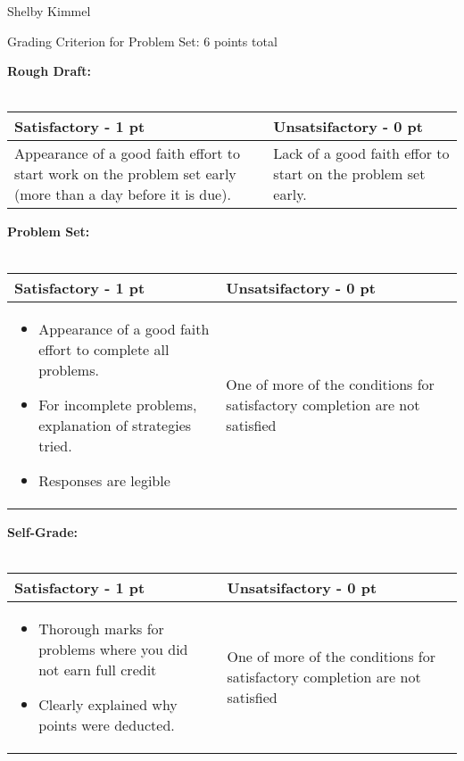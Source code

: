 \documentclass[12pt,landscape]{article}
\begin{document}
\hfill Shelby Kimmel

\begin{center}
{\huge Grading Criterion for Problem Set: 6 points total}
\end{center}
\bigskip

{\large \textbf{Rough Draft:}}\\~\\
{\renewcommand{\arraystretch}{2}
\begin{tabular}{|p{13cm}|p{7cm}|}
\hline
{\bf Satisfactory - 1 pt}& {\bf Unsatsifactory - 0 pt}\\
\hline

Appearance of a good faith effort to start work on the problem set early (more than a day before it is due).

  & Lack of a good faith effor to start on the problem set early.\\
  \hline
\end{tabular}}
\bigskip
\bigskip

{\large \textbf{Problem Set:}}\\~\\
{\renewcommand{\arraystretch}{2}
\begin{tabular}{|p{13cm}|p{7cm}|}
\hline
{\bf Satisfactory - 1 pt}& {\bf Unsatsifactory - 0 pt}\\
\hline
\begin{itemize}
\item Appearance of a good faith effort to complete all problems.
\item For incomplete problems, explanation of strategies tried.
\item Responses are legible
\end{itemize}
  & One of more of the conditions for satisfactory completion are not satisfied\\
  \hline
\end{tabular}}

\newpage
{\large \textbf{ Self-Grade:}}\\~\\
{\renewcommand{\arraystretch}{2}
\begin{tabular}{|p{13cm}|p{7cm}|}
\hline
{\bf Satisfactory - 1 pt}& {\bf Unsatsifactory - 0 pt}\\
\hline
\begin{itemize}
\item Thorough marks for problems where you did not earn full credit
\item Clearly explained why points were deducted.
\end{itemize}
  & One of more of the conditions for satisfactory completion are not satisfied\\
  \hline
\end{tabular}}
\end{document}
